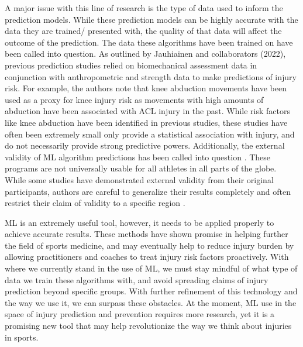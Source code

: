\documentclass[stu,12pt,floatsintext]{apa7}
\begin{document}
A major issue with this line of research is the type of data used to inform the prediction models. While these prediction models can be highly accurate with the data they are trained/ presented with, the quality of that data will affect the outcome of the prediction. The data these algorithms have been trained on have been called into question. As outlined by Jauhiainen and collaborators (2022), previous prediction studies relied on biomechanical assessment data in conjunction with anthropometric and strength data to make predictions of injury risk. For example, the authors note that knee abduction movements have been used as a proxy for knee injury risk as movements with high amounts of abduction have been associated with ACL injury in the past. While risk factors like knee abduction have been identified in previous studies, these studies have often been extremely small only provide a statistical association with injury, and do not necessarily provide strong predictive powers\parencite{Jauhiainen_2022}. Additionally, the external validity of ML algorithm predictions has been called into question \parencite{Martin_2022}. These programs are not universally usable for all athletes in all parts of the globe. While some studies have demonstrated external validity from their original participants, authors are careful to generalize their results completely and often restrict their claim of validity to a specific region \parencite{Martin_2022}.

ML is an extremely useful tool, however, it needs to be applied properly to achieve accurate results. These methods have shown promise in helping further the field of sports medicine, and may eventually help to reduce injury burden by allowing practitioners and coaches to treat injury risk factors proactively. With where we currently stand in the use of ML, we must stay mindful of what type of data we train these algorithms with, and avoid spreading claims of injury prediction beyond specific groups. With further refinement of this technology and the way we use it, we can surpass these obstacles. At the moment, ML use in the space of injury prediction and prevention requires more research, yet it is a promising new tool that may help revolutionize the way we think about injuries in sports.

\printbibliography
\end{document}
